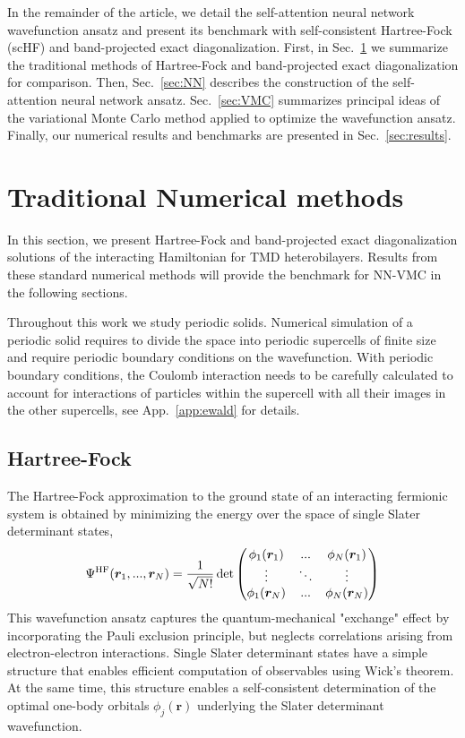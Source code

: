 \documentclass[
 reprint,
 amsmath,amssymb,
 aps, prx,
floatfix,longbibliography,
]{revtex4-2}
\begin{document}
In the remainder of the article, we detail the self-attention neural network wavefunction ansatz and present its benchmark with self-consistent Hartree-Fock (scHF) and band-projected exact diagonalization. 
First, in Sec.~\ref{sec:traditional_methods} we summarize the traditional methods of Hartree-Fock and band-projected exact diagonalization for comparison. Then, 
Sec.~\ref{sec:NN} describes the construction of the self-attention neural network ansatz. 
Sec.~\ref{sec:VMC} summarizes principal ideas of the variational Monte Carlo method applied to optimize the wavefunction ansatz. Finally, our numerical results and benchmarks are presented in Sec.~\ref{sec:results}.

\section{Traditional Numerical methods}
\label{sec:traditional_methods}
In this section, we present Hartree-Fock and band-projected exact diagonalization solutions of the interacting Hamiltonian for TMD heterobilayers. Results from these standard numerical methods will provide the benchmark for NN-VMC in the following sections.       

Throughout this work we study periodic solids. Numerical simulation of a periodic solid requires to divide the space into periodic supercells of finite size and require periodic boundary conditions on the wavefunction.
With periodic boundary conditions, the Coulomb interaction needs to be carefully calculated to account for interactions of particles within the supercell with all their images in the other supercells, see App.~\ref{app:ewald} for details. 

\subsection{Hartree-Fock}

The Hartree-Fock approximation to the ground state of an interacting fermionic system is obtained by minimizing the energy over the space of single Slater determinant states,
\begin{equation}
    \Psi^{\rm HF}({\bm r}_1, ..., {\bm r}_N) = \frac{1}{\sqrt{N !}}\det \begin{pmatrix} \phi_1(\bm r_1) & ... & \phi_N(\bm r_1) \\ 
    \vdots & \ddots & \vdots \\
    \phi_1(\bm r_N) & ... & \phi_N(\bm r_N)\end{pmatrix}
    \label{eq:HF-SlaterDet}
\end{equation}
This wavefunction ansatz captures the quantum-mechanical "exchange" effect by incorporating the Pauli exclusion principle, but neglects correlations arising from electron-electron interactions. Single Slater determinant states have a simple structure that enables efficient computation of observables using Wick's theorem. At the same time, this structure enables a self-consistent determination of the optimal one-body orbitals $\phi_j(\bm r)$ underlying the Slater determinant wavefunction.
\end{document}
